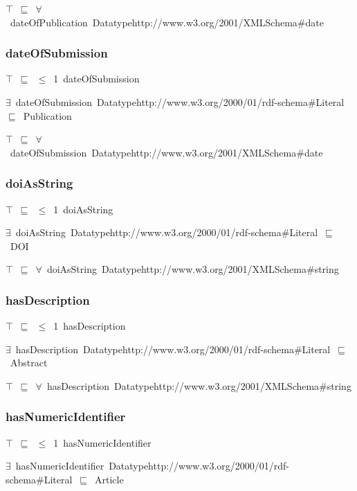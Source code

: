 \documentclass{article}
\begin{document}
\ensuremath{\top}~\ensuremath{\sqsubseteq}~\ensuremath{\forall}~dateOfPublication~Datatypehttp://www.w3.org/2001/XMLSchema#date

\subsubsection*{dateOfSubmission}

\ensuremath{\top}~\ensuremath{\sqsubseteq}~\ensuremath{\leq}~1~dateOfSubmission

\ensuremath{\exists}~dateOfSubmission~Datatypehttp://www.w3.org/2000/01/rdf-schema#Literal~\ensuremath{\sqsubseteq}~Publication

\ensuremath{\top}~\ensuremath{\sqsubseteq}~\ensuremath{\forall}~dateOfSubmission~Datatypehttp://www.w3.org/2001/XMLSchema#date

\subsubsection*{doiAsString}

\ensuremath{\top}~\ensuremath{\sqsubseteq}~\ensuremath{\leq}~1~doiAsString

\ensuremath{\exists}~doiAsString~Datatypehttp://www.w3.org/2000/01/rdf-schema#Literal~\ensuremath{\sqsubseteq}~DOI

\ensuremath{\top}~\ensuremath{\sqsubseteq}~\ensuremath{\forall}~doiAsString~Datatypehttp://www.w3.org/2001/XMLSchema#string

\subsubsection*{hasDescription}

\ensuremath{\top}~\ensuremath{\sqsubseteq}~\ensuremath{\leq}~1~hasDescription

\ensuremath{\exists}~hasDescription~Datatypehttp://www.w3.org/2000/01/rdf-schema#Literal~\ensuremath{\sqsubseteq}~Abstract

\ensuremath{\top}~\ensuremath{\sqsubseteq}~\ensuremath{\forall}~hasDescription~Datatypehttp://www.w3.org/2001/XMLSchema#string

\subsubsection*{hasNumericIdentifier}

\ensuremath{\top}~\ensuremath{\sqsubseteq}~\ensuremath{\leq}~1~hasNumericIdentifier

\ensuremath{\exists}~hasNumericIdentifier~Datatypehttp://www.w3.org/2000/01/rdf-schema#Literal~\ensuremath{\sqsubseteq}~Article
\end{document}
